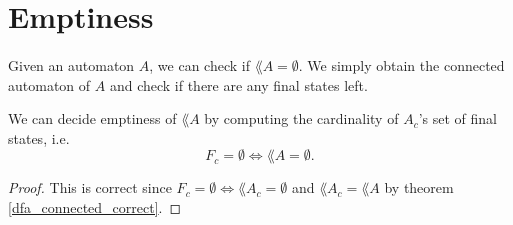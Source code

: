 


        \section{Emptiness}
        \paragraph{}
        Given an automaton $A$, we can check if $\lang{A} = \emptyset$. We simply obtain the connected automaton of $A$ and check if there are any final states left. 
        \begin{theorem} We can decide emptiness of $\lang{A}$ by computing the cardinality of $A_c$'s set of final states, i.e.
            \label{AutomatonEmpty}
            \begin{equation*}        
                F_c = \emptyset \Longleftrightarrow \lang{A} = \emptyset.       
            \end{equation*}
            \end{theorem}

            \begin{proof}
                This is correct since $F_c = \emptyset \Leftrightarrow \lang{A_c} = \emptyset$ and $\lang{A_c} = \lang{A}$ by theorem \ref{dfa_connected_correct}.
            \end{proof}


